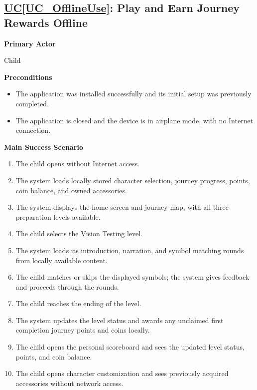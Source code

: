 \documentclass[12pt]{article}
\newcounter{ucnum} %
\newcommand{\ucref}[1]{\hyperref[#1]{UC\ref*{#1}}}
\begin{document}
\label{UC_OfflineUse}
\subsection{\ucref{UC_OfflineUse}: Play and Earn Journey Rewards Offline}

\textbf{Primary Actor}

Child

\textbf{Preconditions}
\begin{itemize}
    \item The application was installed successfully and its
    initial setup was previously completed.
    \item The application is closed and the device is in airplane
    mode, with no Internet connection.
\end{itemize}

\textbf{Main Success Scenario}
\begin{enumerate}
    \item The child opens \progname{} without Internet access.
    \item The system loads locally stored character selection,
    journey progress, points, coin balance, and owned accessories.
    \item The system displays the home screen and journey map,
    with all three preparation levels available.
    \item The child selects the Vision Testing level.
    \item The system loads its introduction, narration, and
    symbol matching rounds from locally available content.
    \item The child matches or skips the displayed symbols;
    the system gives feedback and proceeds through the rounds.
    \item The child reaches the ending of the level.
    \item The system updates the level status and awards any
    unclaimed first completion journey points and coins locally.
    \item The child opens the personal scoreboard and sees the
    updated level status, points, and coin balance.
    \item The child opens character customization and sees
    previously acquired accessories without network access.
\end{enumerate}
\end{document}
